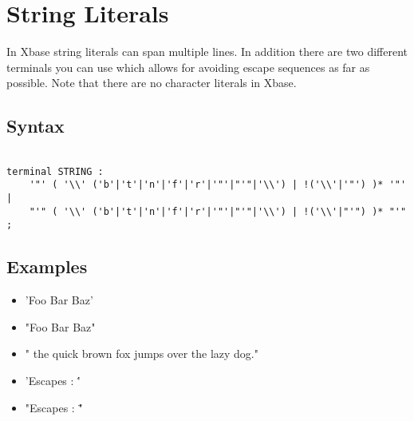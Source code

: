 \documentclass[a4paper,10pt]{scrreprt}
\newlength{\itemindentlen}
\begin{document}
\section{String Literals}
\label{StringLiterals}

In Xbase string literals can span multiple lines. In addition there are two different terminals you can use which allows for avoiding escape sequences as far as possible.
Note that there are no character literals in Xbase.

\subsection{ Syntax }


\begin{lstlisting}

terminal STRING	: 
	'"' ( '\\' ('b'|'t'|'n'|'f'|'r'|'"'|"'"|'\\') | !('\\'|'"') )* '"' |
	"'" ( '\\' ('b'|'t'|'n'|'f'|'r'|'"'|"'"|'\\') | !('\\'|"'") )* "'"
;

\end{lstlisting}





\subsection{ Examples }


\setlength{\itemindentlen}{\textwidth}
\begin{itemize}
\addtolength{\itemindentlen}{-2em}

\item \begin{minipage}[t]{\itemindentlen}
'Foo Bar Baz'
\end{minipage}

\item \begin{minipage}[t]{\itemindentlen}
"Foo Bar Baz"
\end{minipage}

\item \begin{minipage}[t]{\itemindentlen}
" the quick brown fox 
		   jumps over the lazy dog."
\end{minipage}

\item \begin{minipage}[t]{\itemindentlen}
'Escapes : \' '
\end{minipage}

\item \begin{minipage}[t]{\itemindentlen}
"Escapes : \" "
\end{minipage}

\end{itemize}
\addtolength{\itemindentlen}{2em}
\end{document}
